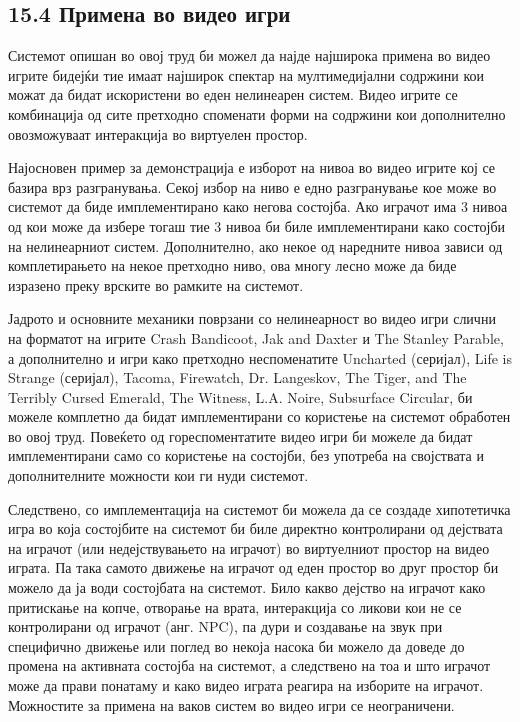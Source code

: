 \subsection{15.4 Примена во видео игри}

Системот опишан во овој труд би можел да најде најширока примена во видео игрите бидејќи тие имаат најширок спектар на мултимедијални содржини кои можат да бидат искористени во еден нелинеарен систем. Видео игрите се комбинација од сите претходно споменати форми на содржини кои дополнително овозможуваат интеракција во виртуелен простор.

Најосновен пример за демонстрација е изборот на нивоа во видео игрите кој се базира врз разгранувања. Секој избор на ниво е едно разгранување кое може во системот да биде имплементирано како негова состојба. Ако играчот има 3 нивоа од кои може да избере тогаш тие 3 нивоа би биле имплементирани како состојби на нелинеарниот систем. Дополнително, ако некое од наредните нивоа зависи од комплетирањето на некое претходно ниво, ова многу лесно може да биде изразено преку врските во рамките на системот.

Јадрото и основните механики поврзани со нелинеарност во видео игри слични на форматот на игрите Crash Bandicoot, Jak and Daxter и The Stanley Parable, а дополнително и игри како претходно неспоменатите Uncharted (серијал), Life is Strange (серијал), Tacoma, Firewatch, Dr. Langeskov, The Tiger, and The Terribly Cursed Emerald, The Witness, L.A. Noire, Subsurface Circular, би можеле комплетно да бидат имплементирани со користење на системот обработен во овој труд. Повеќето од гореспоментатите видео игри би можеле да бидат имплементирани само со користење на состојби, без употреба на својствата и дополнителните можности кои ги нуди системот.

Следствено, со имплементација на системот би можела да се создаде хипотетичка игра во која состојбите на системот би биле директно контролирани од дејствата на играчот (или недејствувањето на играчот) во виртуелниот простор на видео играта. Па така самото движење на играчот од еден простор во друг простор би можело да ја води состојбата на системот. Било какво дејство на играчот како притискање на копче, отворање на врата, интеракција со ликови кои не се контролирани од играчот (анг. NPC), па дури и создавање на звук при специфично движење или поглед во некоја насока би можело да доведе до промена на активната состојба на системот, а следствено на тоа и што играчот може да прави понатаму и како видео играта реагира на изборите на играчот. Можностите за примена на ваков систем во видео игри се неограничени.

